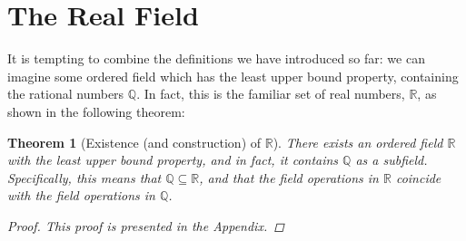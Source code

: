 \documentclass{scrbook}
\newcommand{\Q}{\mathbb{Q}}
\newcommand{\R}{\mathbb{R}}
\newtheorem{theorem}{Theorem}
\begin{document}
\section{The Real Field}
It is tempting to combine the definitions we have introduced so far: we can imagine some ordered field which has the least upper bound property, containing the rational numbers $\Q$. In fact, this is the familiar set of real numbers, $\R$, as shown in the following theorem:

\begin{theorem}[Existence (and construction) of $\R$]
There exists an ordered field $\R$ with the least upper bound property, and in fact, it contains $\Q$ as a subfield. Specifically, this means that $\Q \subseteq \R$, and that the field operations in $\R$ coincide with the field operations in $\Q$. 
\begin{proof}
This proof is presented in the Appendix.
\end{proof}
\end{theorem}
\end{document}
